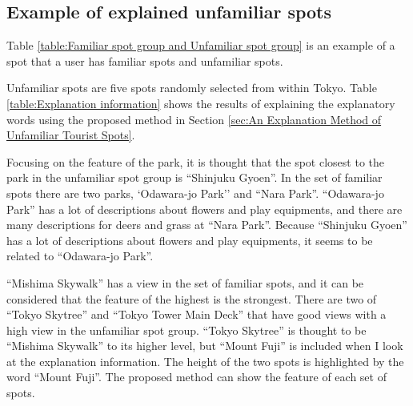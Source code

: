 \documentclass[journal]{IAENGtran}
\begin{document}
\subsection{Example of explained unfamiliar spots}
\label{subsec:Example of explained unfamiliar spots}

Table \ref{table:Familiar spot group and Unfamiliar spot group} is an example of a spot that a user has familiar spots and unfamiliar spots.

Unfamiliar spots are five spots randomly selected from within Tokyo.
Table \ref{table:Explanation information} shows the results of explaining the explanatory words using the proposed method in Section \ref{sec:An Explanation Method of Unfamiliar Tourist Spots}.

Focusing on the feature of the park, it is thought that the spot closest to the park in the unfamiliar spot group is ``Shinjuku Gyoen''.
In the set of familiar spots there are two parks, `Odawara-jo Park'' and ``Nara Park''.
``Odawara-jo Park'' has a lot of descriptions about flowers and play equipments, and there are many descriptions for deers and grass at ``Nara Park''.
Because ``Shinjuku Gyoen'' has a lot of descriptions about flowers and play equipments, it seems to be related to ``Odawara-jo Park''.

``Mishima Skywalk'' has a view in the set of familiar spots, and it can be considered that the feature of the highest is the strongest.
There are two of ``Tokyo Skytree'' and ``Tokyo Tower Main Deck'' that have good views with a high view in the unfamiliar spot group.
``Tokyo Skytree'' is thought to be ``Mishima Skywalk'' to its higher level, but ``Mount Fuji'' is included when I look at the explanation information.
The height of the two spots is highlighted by the word ``Mount Fuji''.
The proposed method can show the feature of each set of spots.
\end{document}
